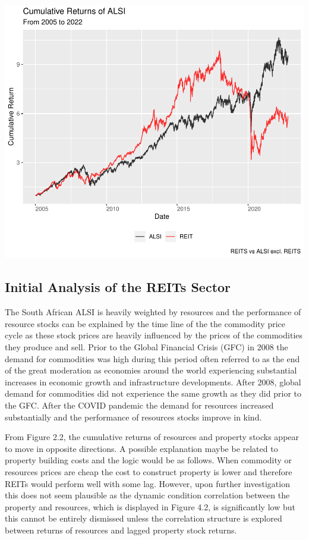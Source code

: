 \documentclass[11pt,preprint, authoryear]{elsarticle}
\let\origfigure\figure
\let\endorigfigure\endfigure
\renewenvironment{figure}[1][2] {
    \expandafter\origfigure\expandafter[H]
} {
    \endorigfigure
}
\numberwithin{equation}{section}
\numberwithin{figure}{section}
\numberwithin{table}{section}
\begin{document}
\begin{figure}
\centering
\includegraphics{Fin_Metrics_Project_files/figure-latex/unnamed-chunk-1-1.pdf}
\caption{Cumulative Returns}
\end{figure}

\hypertarget{initial-analysis-of-the-reits-sector}{%
\subsection{Initial Analysis of the REITs
Sector}\label{initial-analysis-of-the-reits-sector}}

The South African ALSI is heavily weighted by resources and the
performance of resource stocks can be explained by the time line of the
the commodity price cycle as these stock prices are heavily influenced
by the prices of the commodities they produce and sell. Prior to the
Global Financial Crisis (GFC) in 2008 the demand for commodities was
high during this period often referred to as the end of the great
moderation as economies around the world experiencing substantial
increases in economic growth and infrastructure developments. After
2008, global demand for commodities did not experience the same growth
as they did prior to the GFC. After the COVID pandemic the demand for
resources increased substantially and the performance of resources
stocks improve in kind.

From Figure 2.2, the cumulative returns of resources and property stocks
appear to move in opposite directions. A possible explanation maybe be
related to property building costs and the logic would be as follows.
When commodity or resources prices are cheap the cost to construct
property is lower and therefore REITs would perform well with some lag.
However, upon further investigation this does not seem plausible as the
dynamic condition correlation between the property and resources, which
is displayed in Figure 4.2, is significantly low but this cannot be
entirely dismissed unless the correlation structure is explored between
returns of resources and lagged property stock returns.
\end{document}
